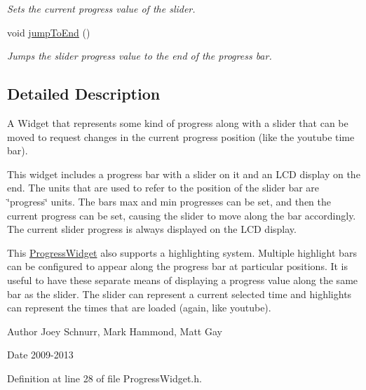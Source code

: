 \begin{DoxyCompactItemize}
\begin{DoxyCompactList}\small\item\em Sets the current progress value of the slider. \end{DoxyCompactList}\item 
\hypertarget{class_progress_widget_a2f86455dd880a393fcca48af01a4787e}{void \hyperlink{class_progress_widget_a2f86455dd880a393fcca48af01a4787e}{jump\-To\-End} ()}\label{class_progress_widget_a2f86455dd880a393fcca48af01a4787e}

\begin{DoxyCompactList}\small\item\em Jumps the slider progress value to the end of the progress bar. \end{DoxyCompactList}\end{DoxyCompactItemize}


\subsection{Detailed Description}
A Widget that represents some kind of progress along with a slider that can be moved to request changes in the current progress position (like the youtube time bar). 

This widget includes a progress bar with a slider on it and an L\-C\-D display on the end. The units that are used to refer to the position of the slider bar are \char`\"{}progress\char`\"{} units. The bars max and min progresses can be set, and then the current progress can be set, causing the slider to move along the bar accordingly. The current slider progress is always displayed on the L\-C\-D display.

This \hyperlink{class_progress_widget}{Progress\-Widget} also supports a highlighting system. Multiple highlight bars can be configured to appear along the progress bar at particular positions. It is useful to have these separate means of displaying a progress value along the same bar as the slider. The slider can represent a current selected time and highlights can represent the times that are loaded (again, like youtube). \begin{DoxyAuthor}{Author}
Joey Schnurr, Mark Hammond, Matt Gay 
\end{DoxyAuthor}
\begin{DoxyDate}{Date}
2009-\/2013 
\end{DoxyDate}


Definition at line 28 of file Progress\-Widget.\-h.



